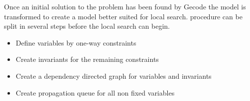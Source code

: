 Once an initial solution to the problem has been found by Gecode the model is transformed to create a model better 
suited for local search.  procedure can 
be split in several steps before the local search can begin. 
\begin{itemize}
  \item Define variables by one-way constraints
 \item Create invariants for the remaining constraints
 \item Create a dependency directed graph for variables and invariants
 \item Create propagation queue for all non fixed variables
\end{itemize}
